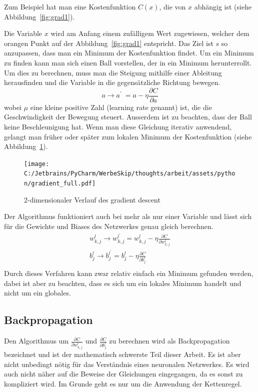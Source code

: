\documentclass[12pt,a4paper]{report}
\begin{document}
Zum Beispiel hat man eine Kostenfunktion $C(x)$, die von $x$ abhängig ist (siehe Abbildung~\ref{fig:grad1}).

Die Variable $x$ wird am Anfang einem zufälligem Wert zugewiesen,
welcher dem orangen Punkt auf der Abbildung~\ref{fig:grad1} entspricht.
Das Ziel ist $s$ so anzupassen,
dass man ein Minimum der Kostenfunktion findet.
Um ein Minimum zu finden kann man sich einen Ball vorstellen, der in ein Minimum herunterrollt.
Um dies zu berechnen, muss man die Steigung mithilfe einer Ableitung herausfinden und die Variable in die
gegensätzliche Richtung bewegen.
\[a \rightarrow a^\prime\ = a - \eta\frac{\partial C}{\partial a}\]
wobei $\mu$ eine kleine positive Zahl (learning rate genannt) ist, die die Geschwindigkeit der Bewegung steuert.
Ausserdem ist zu beachten, dass der Ball keine Beschleunigung hat.
Wenn man diese Gleichung iterativ anwendend, gelangt man früher oder später zum lokalen Minimum der Kostenfunktion (siehe Abbildung~\ref{fig:grad2}).

\begin{figure}[h]%
    \centering
    \texttt{[image: C:/Jetbrains/PyCharm/WerbeSkip/thoughts/arbeit/assets/python/gradient\_full.pdf]} %
    \caption{2-dimensionaler Verlauf des gradient descent}%
    \label{fig:grad2}%
\end{figure}

Der Algorithmus funktioniert auch bei mehr als nur einer Variable und lässt sich für die Gewichte und Biases des Netzwerkes genau gleich berechnen.
\begin{gather*}
    w^l_{k,j} \rightarrow w^{l^\prime}_{k,j} = w^l_{k,j} - \eta\frac{\partial C}{\partial w^l_{k,j}}\\
    b^l_j \rightarrow b^{l^\prime}_j = b^l_j - \eta\frac{\partial C}{\partial b^l_j}\\
\end{gather*}
Durch dieses Verfahren kann zwar relativ einfach ein Minimum gefunden werden, dabei ist aber zu beachten, dass es sich um ein lokales
Minimum handelt und nicht um ein globales.

\subsection{Backpropagation}
Den Algorithmus um $\frac{\partial C}{\partial w^l_{k,j}}$ und $\frac{\partial C}{\partial b^l_j}$ zu berechnen wird als
Backpropagation bezeichnet und ist der mathematisch schwerste Teil dieser Arbeit.
Es ist aber nicht unbedingt nötig für das Verständnis eines neuronalen Netzwerkes.
Es wird auch nicht näher auf die Beweise der Gleichungen eingegangen,
da es sonst zu kompliziert wird.
Im Grunde geht es nur um die Anwendung der Kettenregel.
\end{document}
